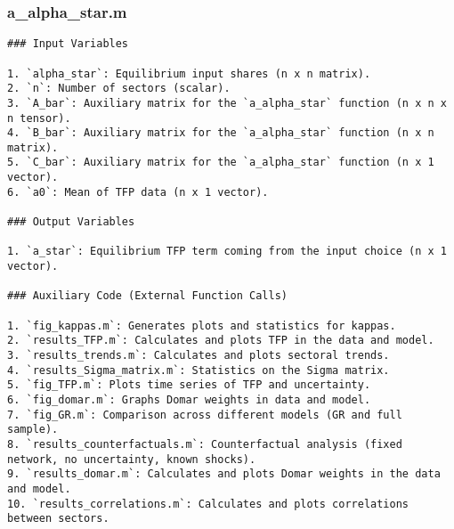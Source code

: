 \documentclass[11pt]{article}
\theoremstyle{definition}
\newcommand{\codepath}{F:/12004835/replication_package_final/replication_package_final}
\begin{document}
	\subsubsection{a\_alpha\_star.m}
	\begin{lstlisting}[style=Matlab]
### Input Variables

1. `alpha_star`: Equilibrium input shares (n x n matrix).
2. `n`: Number of sectors (scalar).
3. `A_bar`: Auxiliary matrix for the `a_alpha_star` function (n x n x n tensor).
4. `B_bar`: Auxiliary matrix for the `a_alpha_star` function (n x n matrix).
5. `C_bar`: Auxiliary matrix for the `a_alpha_star` function (n x 1 vector).
6. `a0`: Mean of TFP data (n x 1 vector).

### Output Variables

1. `a_star`: Equilibrium TFP term coming from the input choice (n x 1 vector).

### Auxiliary Code (External Function Calls)

1. `fig_kappas.m`: Generates plots and statistics for kappas.
2. `results_TFP.m`: Calculates and plots TFP in the data and model.
3. `results_trends.m`: Calculates and plots sectoral trends.
4. `results_Sigma_matrix.m`: Statistics on the Sigma matrix.
5. `fig_TFP.m`: Plots time series of TFP and uncertainty.
6. `fig_domar.m`: Graphs Domar weights in data and model.
7. `fig_GR.m`: Comparison across different models (GR and full sample).
8. `results_counterfactuals.m`: Counterfactual analysis (fixed network, no uncertainty, known shocks).
9. `results_domar.m`: Calculates and plots Domar weights in the data and model.
10. `results_correlations.m`: Calculates and plots correlations between sectors.
	\end{lstlisting}
	
	
	
	
\end{document}
